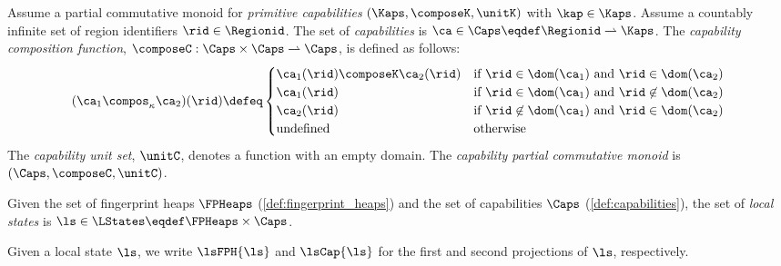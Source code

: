 \begin{definition}[capabilities]\label{def:capabilities}
Assume a partial commutative monoid for \emph{primitive capabilities} $(\Kaps, \composeK, \unitK)$ with $\kap \in \Kaps$.
Assume a countably infinite set of region identifiers $\rid \in \Regionid$. The set of \emph{capabilities} is $\ca \in \Caps \eqdef \Regionid \rightharpoonup \Kaps$.
The \emph{capability composition function}, $\composeC: \Caps \times \Caps \rightharpoonup \Caps$, is defined as follows:
%
\[
	(\ca_1 \compos_{\kappa} \ca_2)(\rid) \defeq 
	\begin{cases}
		\ca_1(\rid) \composeK \ca_2(\rid) & \text{if } \rid \in \dom(\ca_1) \text{ and } \rid \in \dom(\ca_2) \\
		\ca_1(\rid) & \text{if } \rid \in \dom(\ca_1) \text{ and } \rid \not\in \dom(\ca_2) \\
		\ca_2(\rid) & \text{if } \rid \not\in \dom(\ca_1) \text{ and } \rid \in \dom(\ca_2) \\
		\text{undefined} & \text{otherwise}
	\end{cases}
\]
%
The \emph{capability unit set}, $\unitC$, denotes a function with an empty domain.
The \emph{capability partial commutative monoid} is $(\Caps, \composeC, \unitC)$. 
\end{definition}
%
%
\begin{definition}\label{def:local_state}
Given the set of fingerprint heaps $\FPHeaps$ (\ref{def:fingerprint_heaps}) and the set of capabilities $\Caps$ (\ref{def:capabilities}), the set of \emph{local states} is $\ls \in \LStates \eqdef \FPHeaps \times \Caps$.
\end{definition}
%
Given a local state $\ls$, we write $\lsFPH{\ls}$ and $\lsCap{\ls}$ for the first and second projections of $\ls$, respectively.
%
%
